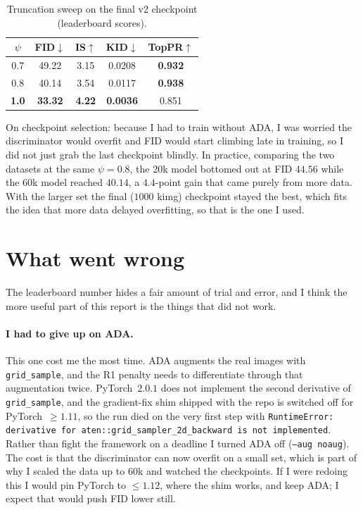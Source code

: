 \documentclass{article}
\begin{document}

\begin{table}[h]
\centering
\caption{Truncation sweep on the final v2 checkpoint (leaderboard scores).}
\label{tab:psi}
\begin{tabular}{ccccc}
\toprule
$\psi$ & FID$\downarrow$ & IS$\uparrow$ & KID$\downarrow$ & TopPR$\uparrow$ \\
\midrule
0.7 & 49.22 & 3.15 & 0.0208 & \textbf{0.932} \\
0.8 & 40.14 & 3.54 & 0.0117 & \textbf{0.938} \\
\textbf{1.0} & \textbf{33.32} & \textbf{4.22} & \textbf{0.0036} & 0.851 \\
\bottomrule
\end{tabular}
\end{table}

On checkpoint selection: because I had to train without ADA, I was worried the discriminator would overfit
and FID would start climbing late in training, so I did not just grab the last checkpoint blindly. In
practice, comparing the two datasets at the same $\psi=0.8$, the 20k model bottomed out at FID $44.56$
while the 60k model reached $40.14$, a $4.4$-point gain that came purely from more data. With the larger
set the final ($1000$ kimg) checkpoint stayed the best, which fits the idea that more data delayed
overfitting, so that is the one I used.

\section{What went wrong}
\label{sec:fail}
The leaderboard number hides a fair amount of trial and error, and I think the more useful part of this
report is the things that did not work.

\paragraph{I had to give up on ADA.}
This one cost me the most time. ADA augments the real images with \texttt{grid\_sample}, and the R1 penalty
needs to differentiate through that augmentation twice. PyTorch~$2.0.1$ does not implement the second
derivative of \texttt{grid\_sample}, and the gradient-fix shim shipped with the repo is switched off for
PyTorch~$\geq 1.11$, so the run died on the very first step with \texttt{RuntimeError: derivative for
aten::grid\_sampler\_2d\_backward is not implemented}. Rather than fight the framework on a deadline I
turned ADA off (\texttt{--aug noaug}). The cost is that the discriminator can now overfit on a small set,
which is part of why I scaled the data up to $60$k and watched the checkpoints. If I were redoing this I
would pin PyTorch to $\leq 1.12$, where the shim works, and keep ADA; I expect that would push FID lower
still.
\end{document}

